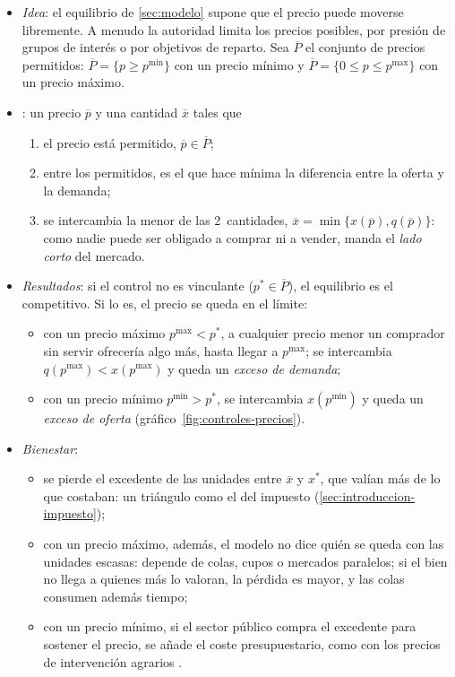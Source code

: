 \documentclass[11pt]{article}
\begin{document}
\begin{itemize}
\item \emph{Idea}: el equilibrio de \ref{sec:modelo} supone que el precio puede moverse libremente. A menudo la autoridad limita los precios posibles, por presión de grupos de interés o por objetivos de reparto. Sea $\overline{P}$ el conjunto de precios permitidos: $\overline{P}=\{p\geq p^{\min}\}$ con un precio mínimo y $\overline{P}=\{0\leq p\leq p^{\max}\}$ con un precio máximo.
\item {}\nocite{RodriguezAlvarez2016Competencia}: un precio $\overline{p}$ y una cantidad $\overline{x}$ tales que
  \begin{enumerate}
  \item el precio está permitido, $\overline{p}\in\overline{P}$;
  \item entre los permitidos, es el que hace mínima la diferencia entre la oferta y la demanda;
  \item se intercambia la menor de las 2~cantidades, $\overline{x}=\min\{x(\overline{p}),q(\overline{p})\}$: como nadie puede ser obligado a comprar ni a vender, manda el \emph{lado corto} del mercado.
  \end{enumerate}
\item \emph{Resultados}: si el control no es vinculante ($p^*\in\overline{P}$), el equilibrio es el competitivo. Si lo es, el precio se queda en el límite:
  \begin{itemize}
  \item con un precio máximo $p^{\max}<p^*$, a cualquier precio menor un comprador sin servir ofrecería algo más, hasta llegar a $p^{\max}$; se intercambia $q(p^{\max})<x(p^{\max})$ y queda un \emph{exceso de demanda};
  \item con un precio mínimo $p^{\min}>p^*$, se intercambia $x(p^{\min})$ y queda un \emph{exceso de oferta} (gráfico~\ref{fig:controles-precios}).
  \end{itemize}
\item \emph{Bienestar}:
  \begin{itemize}
  \item se pierde el excedente de las unidades entre $\overline{x}$ y $x^*$, que valían más de lo que costaban: un triángulo como el del impuesto (\ref{sec:introduccion-impuesto});
  \item con un precio máximo, además, el modelo no dice quién se queda con las unidades escasas: depende de colas, cupos o mercados paralelos; si el bien no llega a quienes más lo valoran, la pérdida es mayor, y las colas consumen además tiempo;
  \item con un precio mínimo, si el sector público compra el excedente para sostener el precio, se añade el coste presupuestario, como con los precios de intervención agrarios .
  \end{itemize}
\end{itemize}
\end{document}
